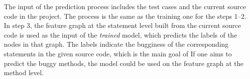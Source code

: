 The input of the prediction process includes the test cases and the
current source code in the project. The process is the same as the
training one for the steps 1--2. In step 3, the feature graph at the
statement level built from the current source code is used as the
input of the {\em trained}  model, which predicts the
labels of the nodes in that graph. The labels indicate the bugginess
of the corresponding statements in the given source code, which is the main goal of {\tool}
If one aims to predict the buggy methods, the  model could be used
on the feature graph at the method level.

